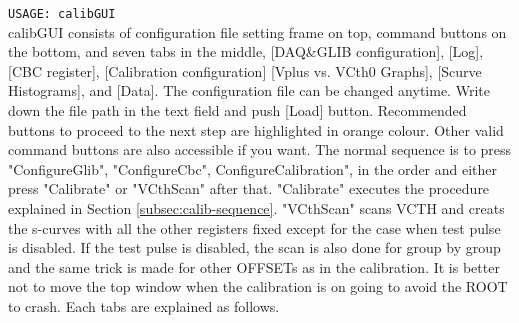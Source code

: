 \documentclass[11pt,a4paper]{article}
\begin{document}
	\verb|USAGE: calibGUI|\\
		calibGUI consists of configuration file setting frame on top, command buttons on the bottom, and seven tabs in the middle, [DAQ\&GLIB configuration], [Log], [CBC register], 
	[Calibration configuration] [Vplus vs. VCth0 Graphs], [Scurve Histograms], and [Data].
	The configuration file can be changed anytime. Write down the file path in the text field and push [Load] button.  Recommended buttons to proceed to the next step are highlighted in orange colour. Other valid command buttons are also accessible if you want.
	The normal sequence is to press "ConfigureGlib", "ConfigureCbc", ConfigureCalibration", in the order and either press "Calibrate" or "VCthScan" after that.
	"Calibrate" executes the procedure explained in Section \ref{subsec:calib-sequence}.
	"VCthScan" scans VCTH and creats the s-curves with all the other registers fixed except for the case when test pulse is disabled. 
	If the test pulse is disabled, the scan is also done for group by group and the same trick is made for other OFFSETs as in the calibration. 
	It is better not to move the top window when the calibration is on going to avoid the ROOT to crash.
	Each tabs are explained as follows.
\end{document}
